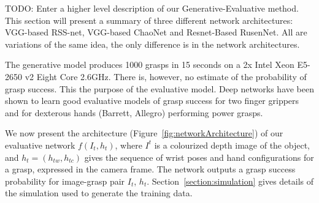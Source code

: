 TODO: Enter a higher level description of our Generative-Evaluative method. This section will present a summary of three different network architectures: VGG-based RSS-net, VGG-based ChaoNet and Resnet-Based RusenNet. All are variations of the same idea, the only difference is in the network architectures. 

The generative model produces 1000 grasps in 15 seconds on a 2x Intel Xeon E5-2650 v2 Eight Core 2.6GHz. There is, however, no estimate of the probability of grasp success. This the purpose of the evaluative model. Deep networks have been shown to learn good evaluative models of grasp success for two finger grippers and for dexterous hands (Barrett, Allegro) performing power grasps.  

We now present the architecture (Figure~\ref{fig:networkArchitecture}) of our evaluative network $f(I_t, h_t)$, where $I^t$ is a colourized depth image of the object, and $h_t = (h_{tw}, h_{tc})$ gives the sequence of wrist poses and hand configurations for a grasp, expressed in the camera frame. The network outputs a grasp success probability for image-grasp pair $I_t$, $h_t$. Section~\ref{section:simulation} gives details of the simulation used to generate the training data.

